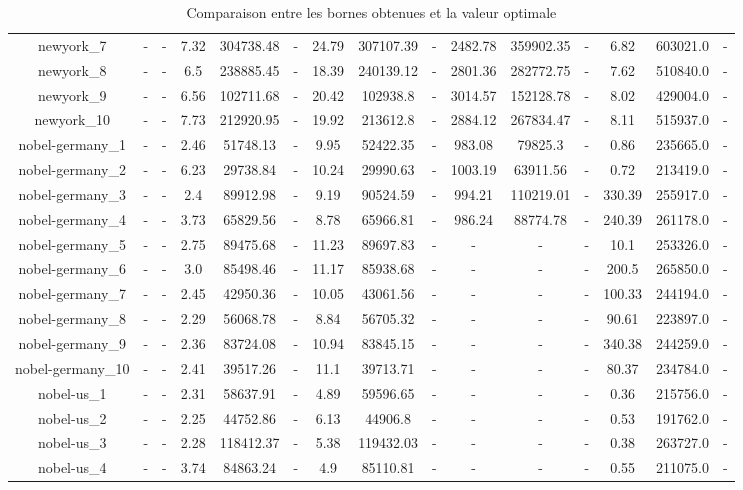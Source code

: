 \documentclass[main.tex]{subfiles}
\begin{document}
\begin{landscape}
\begin{table}[h]
\begin{tabular}{c|cc|ccc|ccc|ccc|ccc}
	newyork\_7 &- &- &7.32 &304738.48 &- &24.79 &307107.39 &- &2482.78 &359902.35 &- &6.82 &603021.0 &-\\
	newyork\_8 &- &- &6.5 &238885.45 &- &18.39 &240139.12 &- &2801.36 &282772.75 &- &7.62 &510840.0 &-\\
	newyork\_9 &- &- &6.56 &102711.68 &- &20.42 &102938.8 &- &3014.57 &152128.78 &- &8.02 &429004.0 &-\\
	newyork\_10 &- &- &7.73 &212920.95 &- &19.92 &213612.8 &- &2884.12 &267834.47 &- &8.11 &515937.0 &-\\
	nobel-germany\_1 &- &- &2.46 &51748.13 &- &9.95 &52422.35 &- &983.08 &79825.3 &- &0.86 &235665.0 &-\\
	nobel-germany\_2 &- &- &6.23 &29738.84 &- &10.24 &29990.63 &- &1003.19 &63911.56 &- &0.72 &213419.0 &-\\
	nobel-germany\_3 &- &- &2.4 &89912.98 &- &9.19 &90524.59 &- &994.21 &110219.01 &- &330.39 &255917.0 &-\\
	nobel-germany\_4 &- &- &3.73 &65829.56 &- &8.78 &65966.81 &- &986.24 &88774.78 &- &240.39 &261178.0 &-\\
	nobel-germany\_5 &- &- &2.75 &89475.68 &- &11.23 &89697.83 &- &- &- &- &10.1 &253326.0 &-\\
	nobel-germany\_6 &- &- &3.0 &85498.46 &- &11.17 &85938.68 &- &- &- &- &200.5 &265850.0 &-\\
	nobel-germany\_7 &- &- &2.45 &42950.36 &- &10.05 &43061.56 &- &- &- &- &100.33 &244194.0 &-\\
	nobel-germany\_8 &- &- &2.29 &56068.78 &- &8.84 &56705.32 &- &- &- &- &90.61 &223897.0 &-\\
	nobel-germany\_9 &- &- &2.36 &83724.08 &- &10.94 &83845.15 &- &- &- &- &340.38 &244259.0 &-\\
	nobel-germany\_10 &- &- &2.41 &39517.26 &- &11.1 &39713.71 &- &- &- &- &80.37 &234784.0 &-\\
	nobel-us\_1 &- &- &2.31 &58637.91 &- &4.89 &59596.65 &- &- &- &- &0.36 &215756.0 &-\\
	nobel-us\_2 &- &- &2.25 &44752.86 &- &6.13 &44906.8 &- &- &- &- &0.53 &191762.0 &-\\
	nobel-us\_3 &- &- &2.28 &118412.37 &- &5.38 &119432.03 &- &- &- &- &0.38 &263727.0 &-\\
	nobel-us\_4 &- &- &3.74 &84863.24 &- &4.9 &85110.81 &- &- &- &- &0.55 &211075.0 &-\\
\end{tabular}\caption{Comparaison entre les bornes obtenues et la valeur optimale}
\end{table}
\end{landscape}
\end{document}
